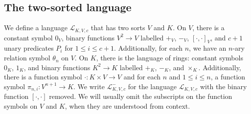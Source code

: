 \documentclass[psamsfonts]{amsart}
\theoremstyle{definition}
\theoremstyle{definition}
\theoremstyle{remark}
\numberwithin{equation}{section}
\newcommand\LL{\mathscr{L}}
\begin{document}
\subsection{The two-sorted language}
We define a language $\LL_{K,V,c}$ that has two sorts $V$ and $K$.  On $V$, there is a constant symbol $0_{V}$, binary functions $V^{2} \to V$ labelled $+_{V}$, $-_{V}$, $[\cdot,\cdot]_{V}$, and $c+1$ unary predicates $P_{i}$ for $1 \leq i \leq c+1$.  Additionally, for each $n$, we have an $n$-ary relation symbol $\theta_{n}$ on $V$.  On $K$, there is the language of rings: constant symbols $0_{K}$, $1_{K}$, and binary functions $K^{2} \to K$ labelled $+_{K}$, $-_{K}$, and $\times_{K}$.  Additionally, there is a function symbol $\cdot : K \times V \to V$ and for each $n$ and $1 \leq i \leq n$, a function symbol $\pi_{n,i} : V^{n+1} \to K$.  We write $\LL_{K,V,c}^{-}$ for the language $\LL_{K,V,c}$ with the binary function $[\cdot,\cdot]$ removed.  We will usually omit the subscripts on the function symbols on $V$ and $K$, when they are understood from context.
\end{document}

